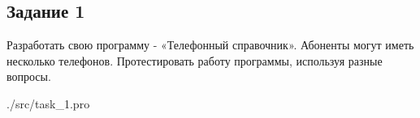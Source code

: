 \subsection*{Задание 1}
Разработать свою программу - «Телефонный справочник». Абоненты могут иметь
несколько телефонов. Протестировать работу программы, используя разные вопросы. 

\begin{lstinputlisting}[
	label={lst:t1},
	]{./src/task_1.pro}
\end{lstinputlisting}